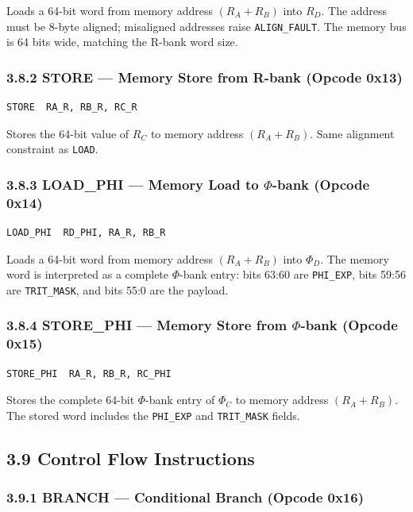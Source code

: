 Loads a 64-bit word from memory address
\((R_A + R_B)\) into \(R_D\). The address must be 8-byte
aligned; misaligned addresses raise \texttt{ALIGN\_FAULT}.
The memory bus is 64 bits wide, matching the R-bank word size.

\subsubsection{3.8.2 STORE --- Memory Store from R-bank (Opcode 0x13)}

\begin{verbatim}
STORE  RA_R, RB_R, RC_R
\end{verbatim}

Stores the 64-bit value of \(R_C\) to memory address
\((R_A + R_B)\). Same alignment constraint as \texttt{LOAD}.

\subsubsection{3.8.3 LOAD\_PHI --- Memory Load to $\Phi$-bank (Opcode 0x14)}

\begin{verbatim}
LOAD_PHI  RD_PHI, RA_R, RB_R
\end{verbatim}

Loads a 64-bit word from memory address \((R_A + R_B)\) into
\(\Phi_D\). The memory word is interpreted as a complete
$\Phi$-bank entry: bits 63:60 are \texttt{PHI\_EXP}, bits
59:56 are \texttt{TRIT\_MASK}, and bits 55:0 are the payload.

\subsubsection{3.8.4 STORE\_PHI --- Memory Store from $\Phi$-bank (Opcode 0x15)}

\begin{verbatim}
STORE_PHI  RA_R, RB_R, RC_PHI
\end{verbatim}

Stores the complete 64-bit $\Phi$-bank entry of \(\Phi_C\) to
memory address \((R_A + R_B)\). The stored word includes the
\texttt{PHI\_EXP} and \texttt{TRIT\_MASK} fields.

\subsection{3.9 Control Flow Instructions}\label{fa_71:control-flow}

\subsubsection{3.9.1 BRANCH --- Conditional Branch (Opcode 0x16)}

